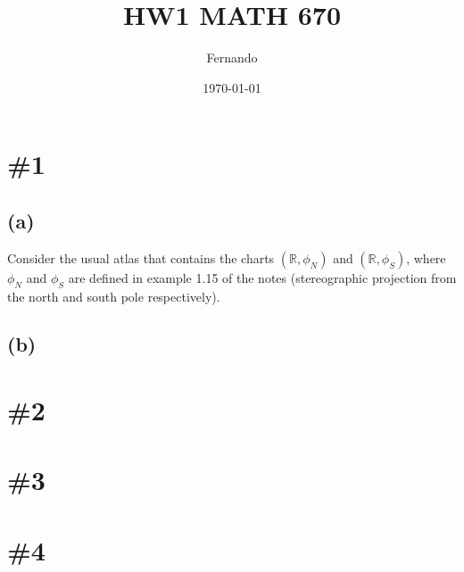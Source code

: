 \documentclass{article}
\begin{document}
\title{HW1 MATH 670}
\author{Fernando}
\date{\today}
\maketitle

\section*{\#1}
\subsection*{(a)}
Consider the usual atlas that contains the charts $(\mathbb{R},\phi_N)$ and
$(\mathbb{R},\phi_S)$, where $\phi_N$ and $\phi_S$ are defined in example 1.15 of the notes (stereographic projection from the north and south pole respectively). 
\subsection*{(b)}
\section{\#2}
\section{\#3}
\section{\#4}
\end{document}

